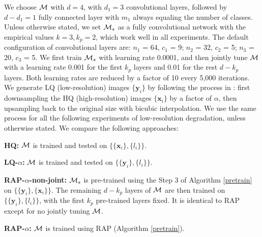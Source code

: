 \documentclass[10pt,twocolumn,twoside]{IEEEtran} %
\begin{document}
We choose ${\mathcal{M}}$ with $d = 4$, with $d_1 = 3$ convolutional layers, followed by $d - d_1 = 1$ fully connected layer with $m_1$ always equaling the number of classes. 
Unless otherwise stated, we set ${\mathcal{M}}_s$ as a fully convolutional network with the empirical values $k=3, k_p = 2$, which work well in all experiments. The default configuration of convolutional layers are: $n_1$ = 64, $c_1$ = 9; $n_2$ = 32, $c_2$ = 5; $n_3$ = 20, $c_3$ = 5. We first train ${\mathcal{M}}_s$ with learning rate 0.0001, and then jointly tune ${\mathcal{M}}$ with a learning rate 0.001 for the first $k_p$ layers and 0.01 for the rest $d - k_p$ layers. Both learning rates are reduced by a factor of 10 every 5,000 iterations. 
We generate LQ (low-resolution) images $\{\mathbf{y}_i\}$ by following the process in \cite{dong2014learning,liu2016robust}: first downsampling the HQ (high-resolution) images $\{\mathbf{x}_i\}$ by a factor of $\alpha$, then upsampling back to the original size with bicubic interpolation. 
We use the same process for all the following experiments of low-resolution degradation, unless otherwise stated.
We compare the following approaches:
	\item \textbf{HQ:} ${\mathcal{M}}$ is trained and tested on $\{\{\mathbf{x}_i\}, \{l_i\}\}$. 
	\item \textbf{LQ-$\alpha$:} ${\mathcal{M}}$ is trained and tested on $\{\{\mathbf{y}_i\}, \{l_i\}\}$. 
	\item \textbf{RAP-$\alpha$-non-joint:} ${\mathcal{M}}_s$ is pre-trained using the Step 3 of Algorithm \ref{pretrain} on $\{\{\mathbf{y}_i\},\{\mathbf{x}_i\}\}$. The remaining $d-k_p$ layers of ${\mathcal{M}}$ are then trained on $\{\{\mathbf{y}_i\}, \{l_i\}\}$, with the first $k_p$ pre-trained layers fixed. It is identical to RAP except for no jointly tuning ${\mathcal{M}}$. 
	\item \textbf{RAP-$\alpha$:}  ${\mathcal{M}}$ is trained using RAP (Algorithm \ref{pretrain}).
\end{document}
